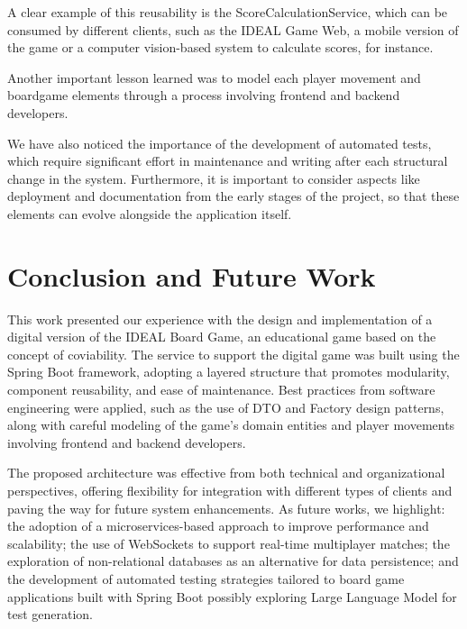 \documentclass[english]{sbc2025}
\begin{document}
A clear example of this reusability is the ScoreCalculationService, which can be consumed by different clients, such as the IDEAL Game Web, a mobile version of the game or a computer vision-based system to calculate scores, for instance. 

Another important lesson learned was to model each player movement and boardgame elements through a process involving frontend and backend developers.

We have also noticed the importance of the development of automated tests, which require significant effort in maintenance and writing after each structural change in the system. Furthermore, it is important to consider aspects like deployment and documentation from the early stages of the project, so that these elements can evolve alongside the application itself.

\section{Conclusion and Future Work}

This work presented our experience with the design and implementation of a digital version of the IDEAL Board Game, an educational game based on the concept of coviability. The service to support the digital game was built using the Spring Boot framework, adopting a layered structure that promotes modularity, component reusability, and ease of maintenance. Best practices from software engineering were applied, such as the use of DTO and Factory design patterns, along with careful modeling of the game's domain entities and player movements involving frontend and backend developers.

The proposed architecture was effective from both technical and organizational perspectives, offering flexibility for integration with different types of clients and paving the way for future system enhancements. As future works, we highlight: the adoption of a microservices-based approach to improve performance and scalability; the use of WebSockets to support real-time multiplayer matches; the exploration of non-relational databases as an alternative for data persistence; and the development of automated testing strategies tailored to board game applications built with Spring Boot possibly exploring Large Language Model for test generation.




\end{document}
